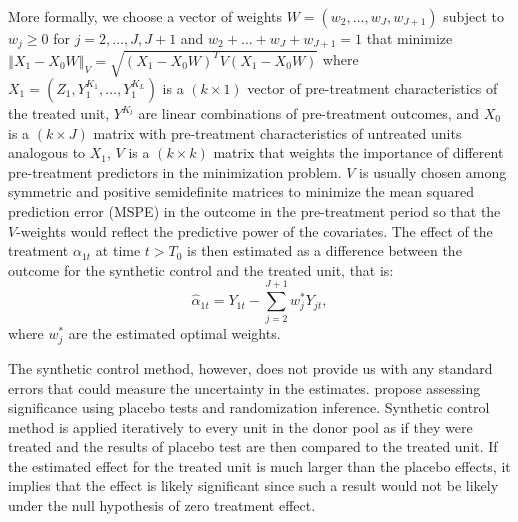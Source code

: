  
 More formally, we choose a vector of weights $W = (w_2, \dots, w_J, w_{J+1})$ subject to $w_j \geq 0$ for $j = 2, \dots, J, J + 1$ and $w_2 +  \dots + w_J + w_{J+1} = 1$ that minimize $\left\Vert X_1 - X_0 W \right\Vert_V = \sqrt{\left(X_1 - X_0 W\right)^T V \left(X_1 - X_0 W\right)}$ where
  $X_1 = (Z_1, Y_1^{K_1}, \dots, Y_1^{K_L})$ is a $(k \times 1)$ vector of pre-treatment characteristics of the treated unit,  $Y^{K_l}$ are linear combinations of
pre-treatment outcomes, and %
  $X_0$ is a $(k \times J)$ matrix with pre-treatment characteristics of untreated units analogous to $X_1$, 
  $V$ is  a $(k \times k)$  matrix that weights the importance of different pre-treatment predictors in the minimization problem. 
  $V$ is usually chosen among symmetric and positive semidefinite matrices to minimize the  mean squared prediction error (MSPE) in the outcome in the pre-treatment period so that the $V$-weights would reflect the predictive power of the covariates. 
The effect of the treatment $\alpha_{1t}$ at time $t > T_0$ is then estimated as a difference between the outcome for the synthetic control and the treated unit, that is:
\begin{equation}
  \hat\alpha_{1t}  = Y_{1t} - \sum_{j = 2}^{J + 1} w_j^* Y_{jt},
\end{equation}
where $w^*_j$ are the estimated optimal weights. 

The synthetic control method, however, does not provide us with any standard errors that could measure the uncertainty in the estimates.
\citet{abadie_synthetic_2010} propose assessing significance  using  placebo tests and randomization inference. Synthetic control method is applied iteratively to every unit in the donor pool as if they were treated and the results of placebo test are then compared to the treated unit. If the estimated effect for the treated unit is much larger than the placebo effects, it implies that the effect is likely significant since 
such a result would not be likely under the null hypothesis of zero treatment effect.

